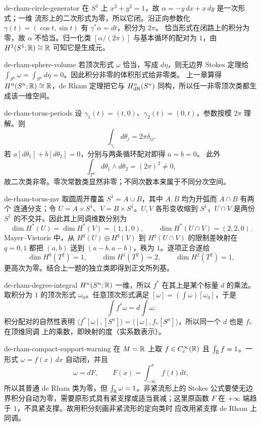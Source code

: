 \begin{solution}{de-rham-circle-generator}
在 $S^1$ 上 $x^2+y^2=1$，故 $\alpha=-y\,dx+x\,dy$ 是一次形式；一维
流形上的二次形式为零，所以它闭。沿正向参数化
$\gamma(t)=(\cos t,\sin t)$ 有 $\gamma^*\alpha=dt$，积分为 $2\pi$。
恰当形式在闭路上的积分为零，故 $\alpha$ 不恰当。归一化类
$[\alpha/(2\pi)]$ 与基本循环的配对为 $1$，由
$H^1(S^1;\mathbb{R})\cong\mathbb{R}$ 可知它是生成元。
\end{solution}

\begin{solution}{de-rham-sphere-volume}
若顶次形式 $\omega$ 恰当，写成 $d\eta$，则无边界 Stokes 定理给
$\int_{S^n}\omega=\int_{S^n}d\eta=0$。因此积分非零的体积形式给非零类。
上一章算得 $H^n(S^n;\mathbb{R})\cong\mathbb{R}$，de Rham 定理把它与
$H^n_{\rm dR}(S^n)$ 同构，所以任一非零顶次类都生成该一维空间。
\end{solution}

\begin{solution}{de-rham-torus-periods}
设 $\gamma_1(t)=(t,0)$、$\gamma_2(t)=(0,t)$，参数按模 $2\pi$ 理解。则
\[
 \int_{\gamma_i}d\theta_j=2\pi\delta_{ij}.
\]
若 $a[d\theta_1]+b[d\theta_2]=0$，分别与两条循环配对即得 $a=b=0$。
此外
\[
 \int_{T^2}d\theta_1\wedge d\theta_2=(2\pi)^2\ne0,
\]
故二次类非零。零次常数类显然非零；不同次数本来属于不同分次空间。
\end{solution}

\begin{solution}{de-rham-torus-mv}
取圆周开覆盖 $S^1=A\cup B$，其中 $A,B$ 均为开弧而 $A\cap B$ 有两个
连通分支；令 $U=A\times S^1$、$V=B\times S^1$。$U,V$ 各形变收缩到
$S^1$，$U\cap V$ 是两份 $S^1$ 的不交并。因此其上同调维数分别为
\[
 \dim H^*(U)=\dim H^*(V)=(1,1,0),\qquad
 \dim H^*(U\cap V)=(2,2,0).
\]
Mayer--Vietoris 中，从 $H^q(U)\oplus H^q(V)$ 到
$H^q(U\cap V)$ 的限制差映射在 $q=0,1$ 都把 $(a,b)$ 送到
$(a-b,a-b)$，秩为 $1$。逐项正合遂给
\[
 \dim H^0(T^2)=1,\qquad \dim H^1(T^2)=2,\qquad
 \dim H^2(T^2)=1,
\]
更高次为零。结合上一题的独立类即得到正文所列基。
\end{solution}

\begin{solution}{de-rham-degree-integral}
$H^n(S^n;\mathbb{R})$ 一维，所以 $f^*$ 在其上是某个标量 $d$ 的乘法。取积分为
$1$ 的顶次形式 $\omega_0$。任意顶次形式满足
$[\omega]=(\int\omega)[\omega_0]$，于是
\[
 \int f^*\omega=d\int\omega.
\]
积分配对的自然性表明
$\langle f^*[\omega],[S^n]\rangle
=\langle[\omega],f_*[S^n]\rangle$，所以同一个 $d$ 也是 $f_*$ 在顶维同调
上的乘数，即映射的度（实系数表示）。
\end{solution}

\begin{solution}{de-rham-compact-support-warning}
在 $M=\mathbb{R}$ 上取 $f\in C_c^\infty(\mathbb{R})$ 且 $\int_{\mathbb{R}} f=1$。一形式
$\omega=f(x)\,dx$ 自动闭，并且
\[
 \omega=dF,\qquad F(x)=\int_{-\infty}^xf(t)dt,
\]
所以其普通 de Rham 类为零，但 $\int_{\mathbb{R}}\omega=1$。非紧流形上的 Stokes
公式要使无边界积分自动为零，需要原形式具有紧支撑或适当衰减；这里原函数
$F$ 在 $+\infty$ 端趋于 $1$，不具紧支撑。故用积分刻画非紧流形的定向类时
应改用紧支撑 de Rham 上同调。
\end{solution}
